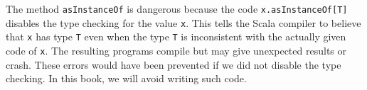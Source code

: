 The method \lstinline!asInstanceOf! is dangerous because the code
\lstinline!x.asInstanceOf[T]! disables the type checking for the
value \lstinline!x!. This tells the Scala compiler to believe that
\lstinline!x! has type \lstinline!T! even when the type \lstinline!T!
is inconsistent with the actually given code of \lstinline!x!. The
resulting programs compile but may give unexpected results or crash.
These errors would have been prevented if we did not disable the type
checking. In this book, we will avoid writing such code.%
\begin{comment}
so suppose we we know we need this type how do we get this code turns
out mathematicians have studied this question for a long time mathematicians
were only studying the logical domain of course not the program in
domain since about 1930 or so many mathematicians have studied this
including church tarski girdle lots of people in Poland and Germany
in England and in the United States it took a very long time about
50 years between 1913 and 1980 between the beginning of this activity
when this was first formulated as logic with these particular rules
and the time when the Curie Howard respondents was realized that or
was it wasn't was discovered at that time it became clear that these
things have a direct bearing on functional programming actually helping
people to write code because if you know how to prove things here
you just directly write the code

~


\end{comment}
